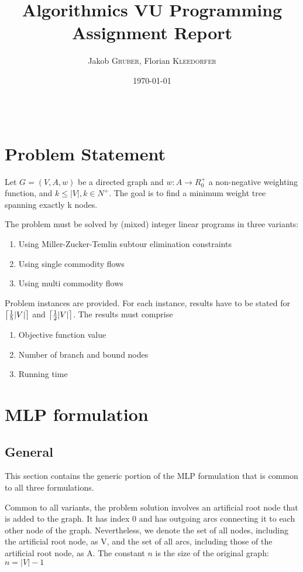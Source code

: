 \documentclass{article}
\title{Algorithmics VU Programming Assignment Report} %
\author{Jakob \textsc{Gruber}, Florian \textsc{Kleedorfer}} %
\date{\today} %
\DeclarePairedDelimiter{\ceil}{\lceil}{\rceil}
\begin{document}
\maketitle %

\begin{center}
\begin{tabular}{l r}
\end{tabular}
\end{center}

\section{Problem Statement}

Let $G=(V,A,w)$ be a directed graph and $w: A \rightarrow R_0^+$ a non-negative weighting function, and $k \leq |V|, k \in N^+$. The goal is to find a minimum weight tree spanning exactly k nodes.

The problem must be solved by (mixed) integer linear programs in three variants:
\begin{enumerate}
	\item Using Miller-Zucker-Temlin subtour elimination constraints
	\item Using single commodity flows
	\item Using multi commodity flows
\end{enumerate}
Problem instances are provided. For each instance, results have to be stated for $\ceil[\big]{\frac{1}{5}|V|}$ and  $\ceil[\big]{\frac{1}{2}|V|}$. The results must comprise 
\begin{enumerate}
\item Objective function value
\item Number of branch and bound nodes
\item Running time
\end{enumerate}

\section{MLP formulation} 
\subsection{General}
This section contains the generic portion of the MLP formulation that is common to all three formulations.

Common to all variants, the problem solution involves an artificial root node that is added to the graph. It has index 0 and has outgoing arcs connecting it to each other node of the graph. Nevertheless, we denote the set of all nodes, including the artificial root node, as V, and the set of all arcs, including those of the artificial root node, as A. The constant $n$ is the size of the original graph: $n = |V| - 1$
\end{document}
